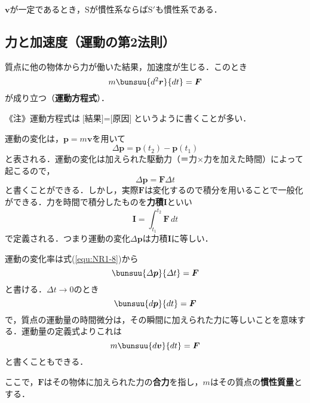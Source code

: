 $\bm{v}$が一定であるとき，$\mathrm{S}$が慣性系ならば$\mathrm{S}'$も慣性系である．



\subsection{力と加速度（運動の第2法則）}
\label{sec:NR1-2-3}

\begin{tcolorbox}[colback=white]
	質点に他の物体から力が働いた結果，加速度が生じる．このとき
	\begin{equation}
		m\bunsuu{d^2\bm{r}}{dt} = \bm{F}
	\end{equation}
が成り立つ（\textbf{運動方程式}）．
\end{tcolorbox}

《注》運動方程式は$\text{[結果]} = \text{[原因]}$というように書くことが多い．

運動の変化は，$\bm{p} = m\bm{v}$を用いて
\begin{equation*}
	\varDelta \bm{p} = \bm{p}(t_2) - \bm{p}(t_1)
\end{equation*}
と表される．運動の変化は加えられた駆動力（＝力×力を加えた時間）によって起こるので，
\begin{equation}
	\label{equ:NR1-8}
	\varDelta \bm{p} = \bm{F}\varDelta t
\end{equation}
と書くことができる．しかし，実際$\bm{F}$は変化するので積分を用いることで一般化ができる．力を時間で積分したものを\textbf{力積}$\bm{I}$といい
\begin{equation*}
	\bm{I} = \int_{t_1}^{t_2} \bm{F}\,dt
\end{equation*}
で定義される．つまり運動の変化$\varDelta\bm{p}$は力積$\bm{I}$に等しい．

運動の変化率は式(\ref{equ:NR1-8})から
\begin{equation*}
	\bunsuu{\varDelta \bm{p}}{\varDelta t} = \bm{F}
\end{equation*}
と書ける．$\varDelta t \to 0$のとき
\begin{equation}
	\bunsuu{d\bm{p}}{dt} = \bm{F}
\end{equation}
で，質点の運動量の時間微分は，その瞬間に加えられた力に等しいことを意味する．運動量の定義式よりこれは
\begin{equation}
	m\bunsuu{d\bm{v}}{dt} = \bm{F}
\end{equation}
と書くこともできる．

ここで，$\bm{F}$はその物体に加えられた力の\textbf{合力}を指し，$m$はその質点の\textbf{慣性質量}とする．

